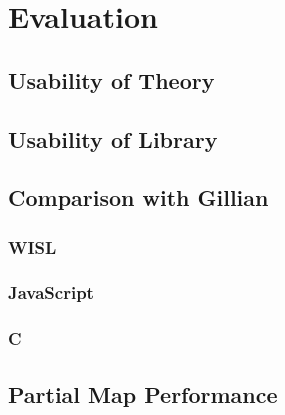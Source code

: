 \chapter{Evaluation}

\section{Usability of Theory}

\section{Usability of Library}

\section{Comparison with Gillian}

\subsection{WISL}

\subsection{JavaScript}

\subsection{C}

\section{Partial Map Performance}